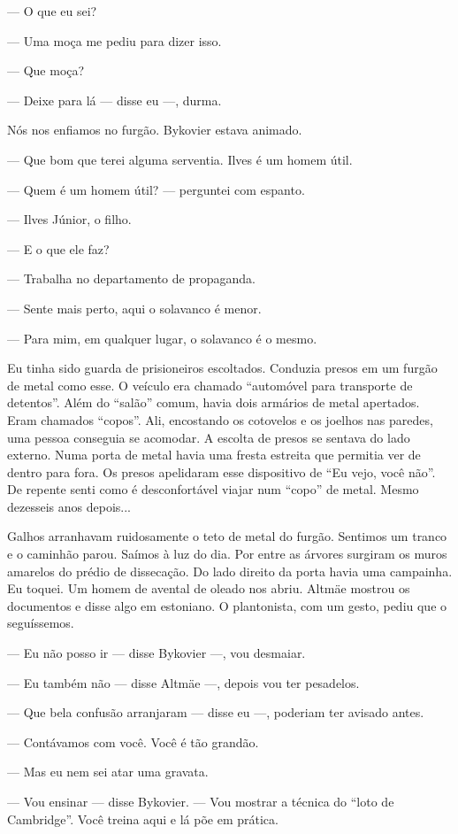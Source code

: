 --- O que eu sei?

--- Uma moça me pediu para dizer isso.

--- Que moça?

--- Deixe para lá --- disse eu ---, durma.

Nós nos enfiamos no furgão. Bykovier estava animado.

--- Que bom que terei alguma serventia. Ilves é um homem útil.

--- Quem é um homem útil? --- perguntei com espanto.

--- Ilves Júnior, o filho.

--- E o que ele faz?

--- Trabalha no departamento de propaganda.

--- Sente mais perto, aqui o solavanco é menor.

--- Para mim, em qualquer lugar, o solavanco é o mesmo.

Eu tinha sido guarda de prisioneiros escoltados. Conduzia presos em um
furgão de metal como esse. O veículo era chamado ``automóvel para
transporte de detentos''. Além do ``salão'' comum, havia dois armários
de metal apertados. Eram chamados ``copos''. Ali, encostando os
cotovelos e os joelhos nas paredes, uma pessoa conseguia se acomodar. A
escolta de presos se sentava do lado externo. Numa porta de metal havia
uma fresta estreita que permitia ver de dentro para fora. Os presos
apelidaram esse dispositivo de ``Eu vejo, você não''. De repente senti
como é desconfortável viajar num ``copo'' de metal. Mesmo dezesseis anos
depois...

Galhos arranhavam ruidosamente o teto de metal do furgão. Sentimos um
tranco e o caminhão parou. Saímos à luz do dia. Por entre as árvores
surgiram os muros amarelos do prédio de dissecação. Do lado direito da
porta havia uma campainha. Eu toquei. Um homem de avental de oleado nos
abriu. Altmäe mostrou os documentos e disse algo em estoniano. O
plantonista, com um gesto, pediu que o seguíssemos.

--- Eu não posso ir --- disse Bykovier ---, vou desmaiar.

--- Eu também não --- disse Altmäe ---, depois vou ter pesadelos.

--- Que bela confusão arranjaram --- disse eu ---, poderiam ter avisado
antes.

--- Contávamos com você. Você é tão grandão.

--- Mas eu nem sei atar uma gravata.

--- Vou ensinar --- disse Bykovier. --- Vou mostrar a técnica do ``loto
de Cambridge''. Você treina aqui e lá põe em prática.


